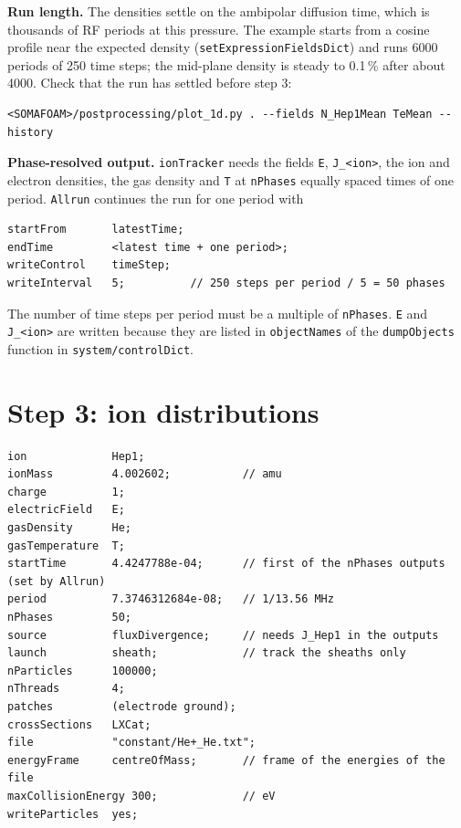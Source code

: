 \documentclass[10pt,a4paper]{article}
\newcommand{\kw}[1]{\texttt{#1}}
\begin{document}
\textbf{Run length.} The densities settle on the ambipolar diffusion time,
which is thousands of RF periods at this pressure. The example starts from a
cosine profile near the expected density (\kw{setExpressionFieldsDict}) and
runs 6000 periods of 250 time steps; the mid-plane density is steady to
0.1\,\% after about 4000. Check that the run has settled before step 3:

\begin{lstlisting}
<SOMAFOAM>/postprocessing/plot_1d.py . --fields N_Hep1Mean TeMean --history
\end{lstlisting}

\textbf{Phase-resolved output.} \kw{ionTracker} needs the fields \kw{E},
\kw{J\_<ion>}, the ion and electron densities, the gas density and \kw{T} at
\kw{nPhases} equally spaced times of one period. \kw{Allrun} continues the
run for one period with

\begin{lstlisting}
startFrom       latestTime;
endTime         <latest time + one period>;
writeControl    timeStep;
writeInterval   5;          // 250 steps per period / 5 = 50 phases
\end{lstlisting}

The number of time steps per period must be a multiple of \kw{nPhases}.
\kw{E} and \kw{J\_<ion>} are written because they are listed in
\kw{objectNames} of the \kw{dumpObjects} function in \kw{system/controlDict}.

\section{Step 3: ion distributions}

\begin{lstlisting}
ion             Hep1;
ionMass         4.002602;           // amu
charge          1;
electricField   E;
gasDensity      He;
gasTemperature  T;
startTime       4.4247788e-04;      // first of the nPhases outputs (set by Allrun)
period          7.3746312684e-08;   // 1/13.56 MHz
nPhases         50;
source          fluxDivergence;     // needs J_Hep1 in the outputs
launch          sheath;             // track the sheaths only
nParticles      100000;
nThreads        4;
patches         (electrode ground);
crossSections   LXCat;
file            "constant/He+_He.txt";
energyFrame     centreOfMass;       // frame of the energies of the file
maxCollisionEnergy 300;             // eV
writeParticles  yes;
\end{lstlisting}
\end{document}

